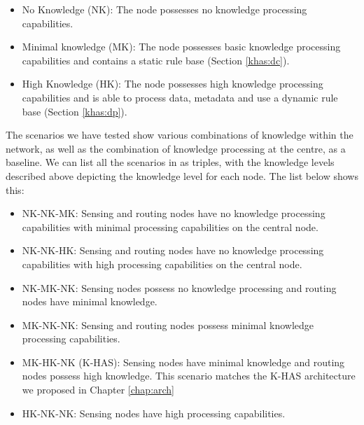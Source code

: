 	\begin{itemize}
		\item No Knowledge (NK): The node possesses no knowledge processing capabilities.
		\item Minimal knowledge (MK): The node possesses basic knowledge processing capabilities and contains a static rule base (Section \ref{khas:dc}).
		\item High Knowledge (HK): The node possesses high knowledge processing capabilities and is able to process data, metadata and use a dynamic rule base (Section \ref{khas:dp}).
	\end{itemize}

The scenarios we have tested show various combinations of knowledge within the network, as well as the combination of knowledge processing at the centre, as a baseline. We can list all the scenarios in as triples, with the knowledge levels described above depicting the knowledge level for each node. The list below shows this:

	\begin{itemize}
		\item NK-NK-MK: Sensing and routing nodes have no knowledge processing capabilities with minimal processing capabilities on the central node.
		\item NK-NK-HK: Sensing and routing nodes have no knowledge processing capabilities with high processing capabilities on the central node.
		\item NK-MK-NK: Sensing nodes possess no knowledge processing and routing nodes have minimal knowledge.
		\item MK-NK-NK: Sensing and routing nodes possess minimal knowledge processing capabilities.
		\item MK-HK-NK (K-HAS): Sensing nodes have minimal knowledge and routing nodes possess high knowledge. This scenario matches the K-HAS architecture we proposed in Chapter \ref{chap:arch}
		\item HK-NK-NK: Sensing nodes have high processing capabilities.	
	\end{itemize}

